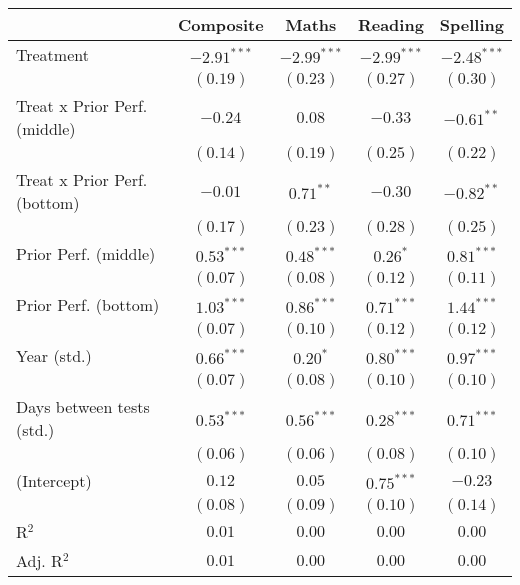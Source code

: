 
\begin{table}
\begin{center}
\begin{tabular}{l c c c c}
\hline
 & Composite & Maths & Reading & Spelling \\
\hline
Treatment                    & $-2.91^{***}$ & $-2.99^{***}$ & $-2.99^{***}$ & $-2.48^{***}$ \\
                             & $(0.19)$      & $(0.23)$      & $(0.27)$      & $(0.30)$      \\
Treat x Prior Perf. (middle) & $-0.24$       & $0.08$        & $-0.33$       & $-0.61^{**}$  \\
                             & $(0.14)$      & $(0.19)$      & $(0.25)$      & $(0.22)$      \\
Treat x Prior Perf. (bottom) & $-0.01$       & $0.71^{**}$   & $-0.30$       & $-0.82^{**}$  \\
                             & $(0.17)$      & $(0.23)$      & $(0.28)$      & $(0.25)$      \\
Prior Perf. (middle)         & $0.53^{***}$  & $0.48^{***}$  & $0.26^{*}$    & $0.81^{***}$  \\
                             & $(0.07)$      & $(0.08)$      & $(0.12)$      & $(0.11)$      \\
Prior Perf. (bottom)         & $1.03^{***}$  & $0.86^{***}$  & $0.71^{***}$  & $1.44^{***}$  \\
                             & $(0.07)$      & $(0.10)$      & $(0.12)$      & $(0.12)$      \\
Year (std.)                  & $0.66^{***}$  & $0.20^{*}$    & $0.80^{***}$  & $0.97^{***}$  \\
                             & $(0.07)$      & $(0.08)$      & $(0.10)$      & $(0.10)$      \\
Days between tests (std.)    & $0.53^{***}$  & $0.56^{***}$  & $0.28^{***}$  & $0.71^{***}$  \\
                             & $(0.06)$      & $(0.06)$      & $(0.08)$      & $(0.10)$      \\
(Intercept)                  & $0.12$        & $0.05$        & $0.75^{***}$  & $-0.23$       \\
                             & $(0.08)$      & $(0.09)$      & $(0.10)$      & $(0.14)$      \\
\hline
R$^2$                        & $0.01$        & $0.00$        & $0.00$        & $0.00$        \\
Adj. R$^2$                   & $0.01$        & $0.00$        & $0.00$        & $0.00$        \\

\end{tabular}
\end{center}
\end{table}
